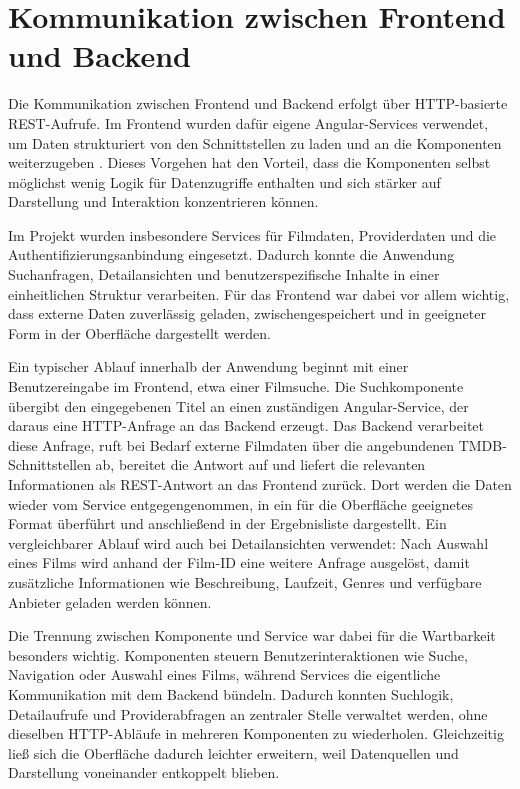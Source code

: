 \section{Kommunikation zwischen Frontend und Backend}
Die Kommunikation zwischen Frontend und Backend erfolgt über HTTP-basierte REST-Aufrufe. Im Frontend wurden dafür eigene Angular-Services verwendet, um Daten strukturiert von den Schnittstellen zu laden und an die Komponenten weiterzugeben \cite{angular_forms}. Dieses Vorgehen hat den Vorteil, dass die Komponenten selbst möglichst wenig Logik für Datenzugriffe enthalten und sich stärker auf Darstellung und Interaktion konzentrieren können.

Im Projekt wurden insbesondere Services für Filmdaten, Providerdaten und die Authentifizierungsanbindung eingesetzt. Dadurch konnte die Anwendung Suchanfragen, Detailansichten und benutzerspezifische Inhalte in einer einheitlichen Struktur verarbeiten. Für das Frontend war dabei vor allem wichtig, dass externe Daten zuverlässig geladen, zwischengespeichert und in geeigneter Form in der Oberfläche dargestellt werden.

Ein typischer Ablauf innerhalb der Anwendung beginnt mit einer Benutzereingabe im Frontend, etwa einer Filmsuche. Die Suchkomponente übergibt den eingegebenen Titel an einen zuständigen Angular-Service, der daraus eine HTTP-Anfrage an das Backend erzeugt. Das Backend verarbeitet diese Anfrage, ruft bei Bedarf externe Filmdaten über die angebundenen TMDB-Schnittstellen ab, bereitet die Antwort auf und liefert die relevanten Informationen als REST-Antwort an das Frontend zurück. Dort werden die Daten wieder vom Service entgegengenommen, in ein für die Oberfläche geeignetes Format überführt und anschließend in der Ergebnisliste dargestellt. Ein vergleichbarer Ablauf wird auch bei Detailansichten verwendet: Nach Auswahl eines Films wird anhand der Film-ID eine weitere Anfrage ausgelöst, damit zusätzliche Informationen wie Beschreibung, Laufzeit, Genres und verfügbare Anbieter geladen werden können.

Die Trennung zwischen Komponente und Service war dabei für die Wartbarkeit besonders wichtig. Komponenten steuern Benutzerinteraktionen wie Suche, Navigation oder Auswahl eines Films, während Services die eigentliche Kommunikation mit dem Backend bündeln. Dadurch konnten Suchlogik, Detailaufrufe und Providerabfragen an zentraler Stelle verwaltet werden, ohne dieselben HTTP-Abläufe in mehreren Komponenten zu wiederholen. Gleichzeitig ließ sich die Oberfläche dadurch leichter erweitern, weil Datenquellen und Darstellung voneinander entkoppelt blieben.

